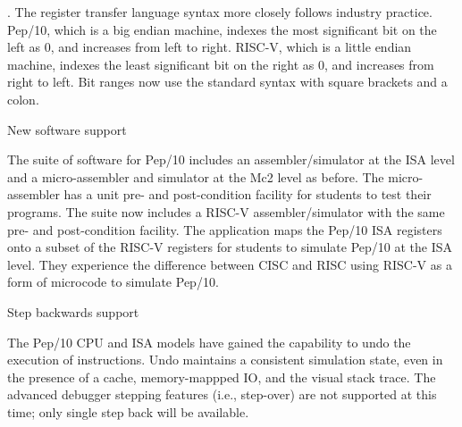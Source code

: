 \documentclass[10pt,fleqn]{book}
\newenvironment{exercises}
   {\begin{list}
      {\arabic{ecounter}.}
      {
         \usecounter{ecounter}
         \setcounter {ecounter}{0}
         \setlength\leftmargin{2pc}
         \setlength\labelwidth{6pc}
         \setlength\labelsep{1pc}
      }}
   {\end{list}}
\newcounter{ecounter}
\begin{document}
\begin{exercises}
The register transfer language syntax more closely follows industry practice.
Pep/10, which is a big endian machine, indexes the most significant bit on the left as 0, and increases from left to right.
RISC-V, which is a little endian machine, indexes the least significant bit on the right as 0, and increases from right to left.
Bit ranges now use the standard syntax with square brackets and a colon.

\item New software support

The suite of software for Pep/10 includes an assembler/simulator at the ISA level and a micro-assembler and simulator at the Mc2 level as before.
The micro-assembler has a unit pre- and post-condition facility for students to test their programs.
The suite now includes a RISC-V assembler/simulator with the same pre- and post-condition facility.
The application maps the Pep/10 ISA registers onto a subset of the RISC-V registers for students to simulate Pep/10 at the ISA level.
They experience the difference between CISC and RISC using RISC-V as a form of microcode to simulate Pep/10.

\item Step backwards support

The Pep/10 CPU and ISA models have gained the capability to undo the execution of instructions.
Undo maintains a consistent simulation state, even in the presence of a cache, memory-mappped IO, and the visual stack trace.
The advanced debugger stepping features (i.e., step-over) are not supported at this time; only single step back will be available.

\end{exercises}

\newpage

\end{document}
